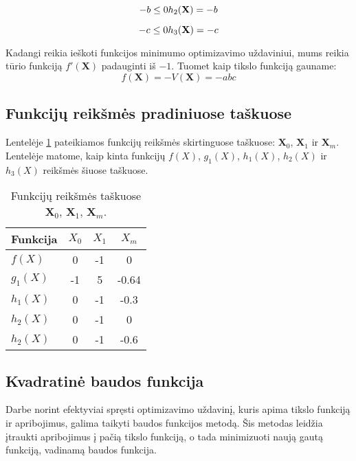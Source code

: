 \documentclass[a4paper,12pt,fleqn]{article}
\begin{document}
\begin{equation}
-b \leq 0 \\
h_2(\mathbf{X}) = -b \\
\end{equation}


\begin{equation}
-c \leq 0 \\
h_3(\mathbf{X}) = -c \\
\end{equation}


Kadangi reikia ieškoti funkcijos minimumo optimizavimo uždaviniui, mums reikia tūrio funkciją $f'(\mathbf{X})$ padauginti iš $-1$. Tuomet kaip tikslo funkciją gauname:
\begin{equation}
f(\mathbf{X}) = -V(\mathbf{X}) = -abc
\end{equation}

\subsection{Funkcijų reikšmės pradiniuose taškuose}

Lentelėje \ref{table:fvals} pateikiamos funkcijų reikšmės skirtinguose taškuose: $\mathbf{X}_0$, $\mathbf{X}_1$ ir $\mathbf{X}_m$. Lentelėje matome, kaip kinta funkcijų $f(X)$, $g_1(X)$, $h_1(X)$, $h_2(X)$ ir $h_3(X)$ reikšmės šiuose taškuose.

\begin{table}[H]
  \centering
  \caption{Funkcijų reikšmės taškuose $\mathbf{X}_0$, $\mathbf{X}_1$, $\mathbf{X}_m$.}
  \def\arraystretch{1.2}
  \setlength{\tabcolsep}{0.8em}
  \begin{tabular}{l c c c}
    \hline\hline
    Funkcija & $X_0$  & $X_1$ & $X_m$ \\ [0.5ex]
    \hline
    $f(X)$   & 0   & -1   & 0    \\ 
    $g_1(X)$ & -1  & 5    & -0.64      \\ 
    $h_1(X)$ & 0   & -1   & -0.3      \\ 
    $h_2(X)$ & 0   & -1   & 0      \\ 
    $h_2(X)$ & 0   & -1   & -0.6      \\ 
    \hline
  \end{tabular}
  \label{table:fvals}
\end{table}

\pagebreak
\subsection{Kvadratinė baudos funkcija}
Darbe norint efektyviai spręsti optimizavimo uždavinį, kuris apima tikslo funkciją ir apribojimus, galima taikyti baudos funkcijos metodą. Šis metodas leidžia įtraukti apribojimus į pačią tikslo funkciją, o tada minimizuoti naują gautą funkciją, vadinamą baudos funkcija.
\end{document}
